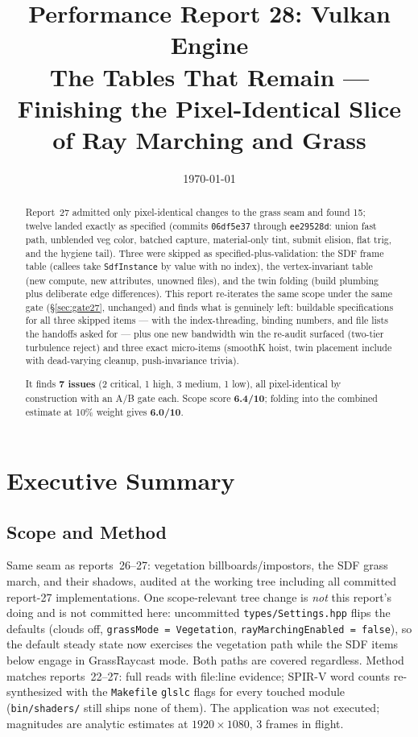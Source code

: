 \documentclass[11pt,a4paper]{article}
\title{Performance Report 28: Vulkan Engine \\
\large The Tables That Remain --- Finishing the Pixel-Identical Slice of Ray Marching and Grass}
\author{}
\date{\today}
\begin{document}
\maketitle

\begin{abstract}
Report~27 admitted only pixel-identical changes to the grass seam and found
15; twelve landed exactly as specified (commits \texttt{06df5e37} through
\texttt{ee29528d}: union fast path, unblended veg color, batched capture,
material-only tint, submit elision, flat trig, and the hygiene tail). Three
were skipped as specified-plus-validation: the SDF frame table (callees take
\texttt{SdfInstance} by value with no index), the vertex-invariant table
(new compute, new attributes, unowned files), and the twin folding (build
plumbing plus deliberate edge differences). This report re-iterates the same
scope under the same gate (\S\ref{sec:gate27}, unchanged) and finds what is
genuinely left: buildable specifications for all three skipped items ---
with the index-threading, binding numbers, and file lists the handoffs asked
for --- plus one new bandwidth win the re-audit surfaced (two-tier
turbulence reject) and three exact micro-items (smoothK hoist, twin
placement include with dead-varying cleanup, push-invariance trivia).

It finds \textbf{7 issues} (2 critical, 1 high, 3 medium, 1 low), all
pixel-identical by construction with an A/B gate each. Scope score
\textbf{6.4/10}; folding into the combined estimate at 10\% weight gives
\textbf{6.0/10}.
\end{abstract}

\tableofcontents
\newpage

\section{Executive Summary}

\subsection{Scope and Method}

Same seam as reports~26--27: vegetation billboards/impostors, the SDF grass
march, and their shadows, audited at the working tree including all
committed report-27 implementations. One scope-relevant tree change is
\emph{not} this report's doing and is not committed here: uncommitted
\texttt{types/Settings.hpp} flips the defaults (clouds off,
\texttt{grassMode = Vegetation}, \texttt{rayMarchingEnabled = false}), so
the default steady state now exercises the vegetation path while the SDF
items below engage in GrassRaycast mode. Both paths are covered regardless.
Method matches reports~22--27: full reads with file:line evidence; SPIR-V
word counts re-synthesized with the \texttt{Makefile} \texttt{glslc} flags
for every touched module (\texttt{bin/shaders/} still ships none of them).
The application was not executed; magnitudes are analytic estimates at
$1920\times1080$, 3 frames in flight.
\end{document}
